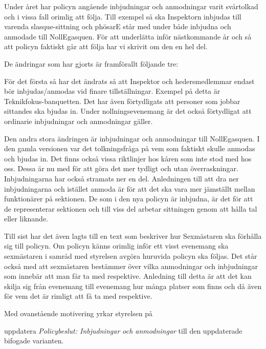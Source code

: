 \documentclass[../_main/handlingar.tex]{subfiles}
\begin{document}

Under året har policyn angående inbjudningar och anmodningar varit svårtolkad och i vissa fall orimlig att följa. Till exempel så ska Inspektorn inbjudas till varenda slasque-sittning och phösarE står med under både inbjudna och anmodade till NollEgasquen. För att underlätta inför nästkommande år och så att policyn faktiskt går att följa har vi skrivit om den en hel del.

De ändringar som har gjorts är framförallt följande tre:

För det första så har det ändrats så att Inspektor och hedersmedlemmar endast bör inbjudas/anmodas vid finare tillställningar. Exempel på detta är Teknikfokus-banquetten. Det har även förtydligats att personer som jobbar sittandes ska bjudas in. Under nollningsevenemang är det också förtydligat att ordinarie inbjudningar och anmodningar gäller. 

Den andra stora ändringen är inbjudningar och anmodningar till NollEgasquen. I den gamla versionen var det tolkningsfråga på vem som faktiskt skulle anmodas och bjudas in. Det finns också vissa riktlinjer hos kåren som inte stod med hos oss. Dessa är nu med för att göra det mer tydligt och utan överraskningar. Inbjudningarna har också stramats ner en del. Anledningen till att dra ner inbjudningarna och istället anmoda är för att det ska vara mer jämställt mellan funktionärer på sektionen. De som i den nya policyn är inbjudna, är det för att de representerar sektionen och till viss del arbetar sittningen genom att hålla tal eller liknande.

Till sist har det även lagts till en text som beskriver hur Sexmästaren ska förhålla sig till policyn. Om policyn känns orimlig inför ett visst evenemang ska sexmästaren i samråd med styrelsen avgöra huruvida policyn ska följas. Det står också med att sexmästaren bestämmer över vilka anmodningar och inbjudningar som innebär att man får ta med respektive. Anledning till detta är att det kan skilja sig från evenemang till evenemang hur många platser som finns och då även för vem det är rimligt att få ta med respektive. 

Med ovanstående motivering yrkar styrelsen på

\begin{attsatser}
    \att uppdatera \textit{Policybeslut: Inbjudningar och anmodningar} till den uppdaterade bifogade varianten.
\end{attsatser}
\end{document}
